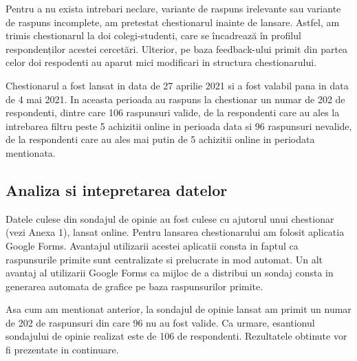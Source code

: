 \documentclass[a4paper, 12pt]{article}
\begin{document}
		\quad Pentru a nu exista intrebari neclare, variante de raspuns irelevante sau variante de raspuns incomplete, am pretestat chestionarul inainte de lansare. Astfel, am trimis chestionarul la doi colegi-studenti, care se încadrează în profilul respondenților acestei cercetări. Ulterior, pe baza feedback-ului primit din partea celor doi respodenti au aparut mici modificari in structura chestionarului.
		
		\quad Chestionarul a fost lansat in data de 27 aprilie 2021 si a fost valabil pana in data de 4 mai 2021. In aceasta perioada au raspuns la chestionar un numar de 202 de respondenti, dintre care 106 raspunsuri valide, de la respondenti care au ales la intrebarea filtru peste 5 achizitii online in perioada data si 96 raspunsuri nevalide, de la respondenti care au ales mai putin de 5 achizitii online in periodata mentionata.
	
		
	\subsection{Analiza si intepretarea datelor}
		\qquad Datele culese din sondajul de opinie au fost culese cu ajutorul unui chestionar (vezi Anexa 1), lansat online. Pentru lansarea chestionarului am folosit aplicatia Google Forms. Avantajul utilizarii acestei aplicatii consta in faptul ca raspunsurile primite sunt centralizate si prelucrate in mod automat. Un alt avantaj al utilizarii Google Forms ca mijloc de a distribui un sondaj consta in generarea automata de grafice pe baza raspunsurilor primite. 
		
		\qquad Asa cum am mentionat anterior, la sondajul de opinie lansat am primit un numar de 202 de raspunsuri din care 96 nu au fost valide. Ca urmare, esantionul sondajului de opinie realizat este de 106 de respondenti. Rezultatele obtinute vor fi prezentate in continuare.
		
\end{document}
